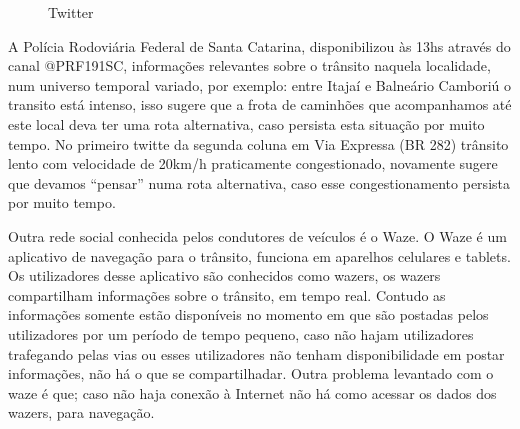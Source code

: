 \documentclass[conference,compsoc]{IEEEtran}
\begin{document}
\begin{figure}[!ht]
\caption{Twitter	}
	\quad \quad \quad \quad
	\label{fig:twitter}
\end{figure}

A Polícia Rodoviária Federal de Santa Catarina, disponibilizou às 13hs através do canal @PRF191SC, informações relevantes sobre o trânsito naquela localidade, 
num universo temporal variado, por exemplo: entre Itajaí e Balneário Camboriú o transito está intenso, isso sugere que a frota de caminhões que acompanhamos até este local deva ter uma
rota alternativa, caso persista esta situação por muito tempo. No primeiro twitte da segunda coluna em Via Expressa (BR 282) trânsito lento com 
velocidade de 20km/h praticamente congestionado, novamente sugere que devamos ``pensar'' numa rota alternativa, caso esse congestionamento persista por muito tempo.

Outra rede social conhecida pelos condutores de veículos é o Waze. O Waze é um aplicativo de navegação para o trânsito, funciona em aparelhos celulares e tablets. Os utilizadores desse aplicativo são conhecidos como wazers, os wazers compartilham informações sobre o trânsito, em tempo real. Contudo as informações somente estão disponíveis no momento em que são postadas pelos utilizadores por um período de tempo pequeno, caso não hajam utilizadores trafegando pelas vias ou esses utilizadores não tenham disponibilidade em postar informações, não há o que se compartilhadar.
Outra problema levantado com o waze é que; caso não haja conexão à Internet não há como acessar os dados dos wazers, para navegação.
\end{document}
